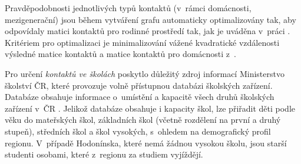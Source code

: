Pravděpodobnosti jednotlivých typů kontaktů (v~rámci domácnosti, mezigenerační) jsou během vytváření grafu automaticky optimalizovány tak, aby odpovídaly matici kontaktů pro rodinné prostředí tak, jak je uváděna v~práci \cite{Prem_etal2017}. Kritériem pro optimalizaci je 
minimalizování vážené kvadratické vzdálenosti výsledné matice kontaktů a matice kontaktů pro domácnosti z~\cite{Prem_etal2017}.




Pro určení \emph{kontaktů ve školách} poskytlo důležitý zdroj informací Ministerstvo školství ČR, které provozuje volně přístupnou databázi školských zařízení. Databáze obsahuje informace o~umístění a kapacitě všech druhů školských zařízení v~ČR \cite{zaj:skolskazarizeni}. Jelikož databáze obsahuje i kapacity škol, lze přiřadit děti podle věku do mateřských škol, základních škol (včetně rozdělení na první a druhý stupeň), středních škol a škol vysokých, s~ohledem na demografický profil regionu. V~případě Hodonínska, které nemá žádnou vysokou školu, jsou starší studenti osobami, které z~regionu za studiem vyjíždějí.

